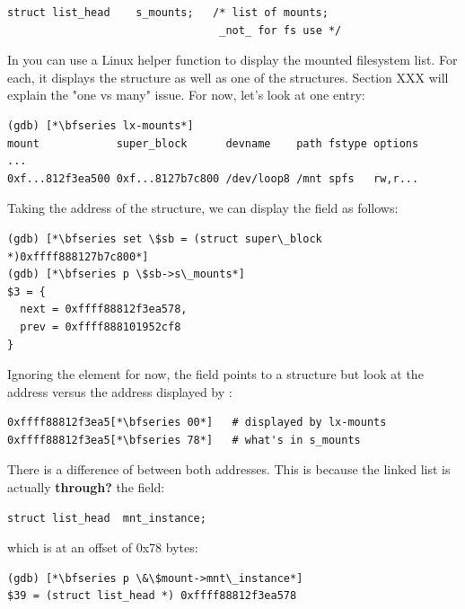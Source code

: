 \begin{lstlisting}
struct list_head    s_mounts;   /* list of mounts; 
                                 _not_ for fs use */
\end{lstlisting}

\noindent
In  you can use a Linux helper function to display the mounted filesystem list. For each, it displays the  structure as well as one of the  structures. Section XXX will explain the "one vs many" issue. For now, let's look at one entry:

\begin{lstlisting}
(gdb) [*\bfseries lx-mounts*]
mount            super_block      devname    path fstype options
...
0xf...812f3ea500 0xf...8127b7c800 /dev/loop8 /mnt spfs   rw,r...
\end{lstlisting}

\noindent
Taking the address of the  structure, we can display the  field as follows:

\begin{lstlisting}
(gdb) [*\bfseries set \$sb = (struct super\_block *)0xffff888127b7c800*]
(gdb) [*\bfseries p \$sb->s\_mounts*]
$3 = {
  next = 0xffff88812f3ea578,
  prev = 0xffff888101952cf8
}
\end{lstlisting}

\noindent
Ignoring the  element for now, the  field points to a  structure but look at the address versus the address displayed by :

\begin{lstlisting}
0xffff88812f3ea5[*\bfseries 00*]   # displayed by lx-mounts
0xffff88812f3ea5[*\bfseries 78*]   # what's in s_mounts
\end{lstlisting}

\noindent
There is a difference of  between both addresses. This is because the linked list is actually \textbf{through?} the  field:

\begin{lstlisting}
struct list_head  mnt_instance;  
\end{lstlisting}

\noindent
which is at an offset of 0x78 bytes:

\begin{lstlisting}
(gdb) [*\bfseries p \&\$mount->mnt\_instance*]
$39 = (struct list_head *) 0xffff88812f3ea578
\end{lstlisting}

